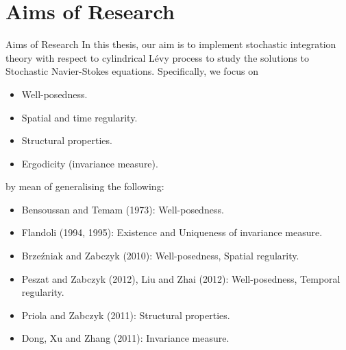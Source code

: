 \documentclass[xcolor=dvipsnames,leqno]{beamer}
\begin{document}
\section[]{Aims of Research}  
\begin{frame}{Aims of Research}    
In this thesis, our aim is to implement stochastic integration theory with respect to cylindrical L\'evy process to study the  solutions to Stochastic Navier-Stokes equations. Specifically, we focus on
	\begin{itemize}
		\item Well-posedness. %
		\item Spatial and time regularity.
		\item Structural properties.
		\item Ergodicity (invariance measure). %
	\end{itemize}   
by mean of generalising the following:
\begin{itemize}
	\item Bensoussan and Temam (1973): Well-posedness.
	\item Flandoli (1994, 1995): Existence and Uniqueness of invariance measure.
	\item  Brze\'zniak and Zabczyk (2010): Well-posedness, Spatial regularity.
	\item  Peszat and Zabczyk (2012), Liu and Zhai (2012): Well-posedness, Temporal regularity.
	\item Priola and Zabczyk (2011): Structural properties.
	\item Dong, Xu and Zhang (2011): Invariance measure.
\end{itemize}
\end{frame}              
    
\end{document}
